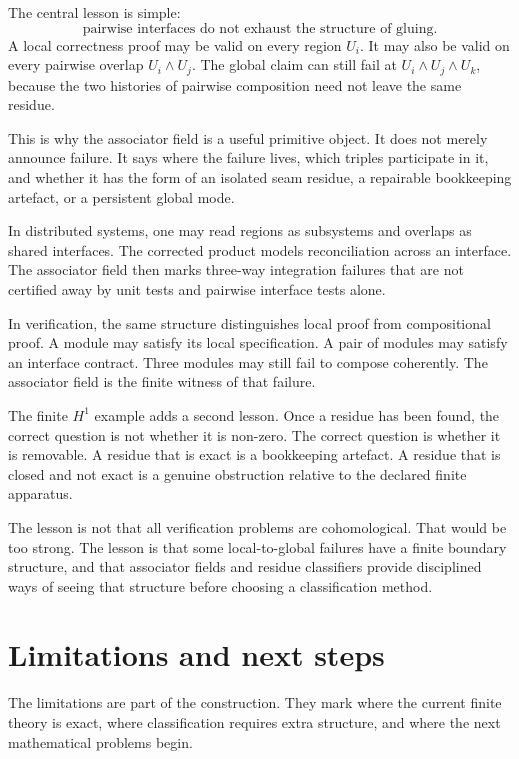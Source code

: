 \documentclass[11pt]{article}
\begin{document}
The central lesson is simple:
\[
\text{pairwise interfaces do not exhaust the structure of gluing.}
\]
A local correctness proof may be valid on every region \(U_i\). It may also be valid on every pairwise overlap \(U_i\wedge U_j\). The global claim can still fail at \(U_i\wedge U_j\wedge U_k\), because the two histories of pairwise composition need not leave the same residue.

This is why the associator field is a useful primitive object. It does not merely announce failure. It says where the failure lives, which triples participate in it, and whether it has the form of an isolated seam residue, a repairable bookkeeping artefact, or a persistent global mode.

In distributed systems, one may read regions as subsystems and overlaps as shared interfaces. The corrected product models reconciliation across an interface. The associator field then marks three-way integration failures that are not certified away by unit tests and pairwise interface tests alone.

In verification, the same structure distinguishes local proof from compositional proof. A module may satisfy its local specification. A pair of modules may satisfy an interface contract. Three modules may still fail to compose coherently. The associator field is the finite witness of that failure.

The finite \(H^1\) example adds a second lesson. Once a residue has been found, the correct question is not whether it is non-zero. The correct question is whether it is removable. A residue that is exact is a bookkeeping artefact. A residue that is closed and not exact is a genuine obstruction relative to the declared finite apparatus.

The lesson is not that all verification problems are cohomological. That would be too strong. The lesson is that some local-to-global failures have a finite boundary structure, and that associator fields and residue classifiers provide disciplined ways of seeing that structure before choosing a classification method.

\section{Limitations and next steps}

The limitations are part of the construction. They mark where the current finite theory is exact, where classification requires extra structure, and where the next mathematical problems begin.
\end{document}
